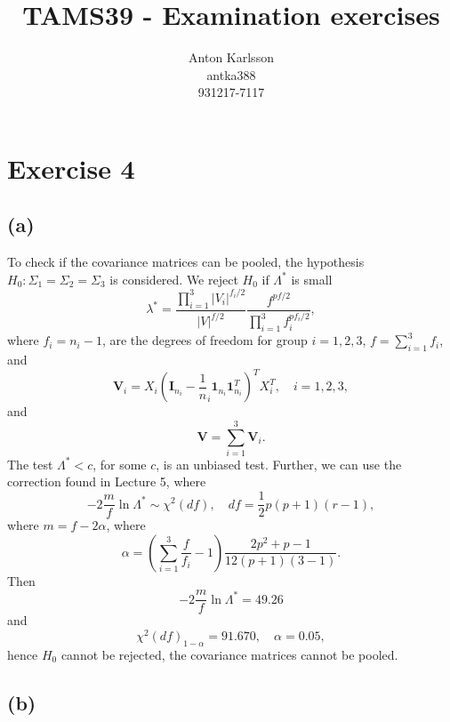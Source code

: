 \message{ !name(examination.tex)}\documentclass[one column]{report}
\title{TAMS39 - Examination exercises}
\author{Anton Karlsson\\antka388\\931217-7117}
\date{}
\renewcommand{\b}[1]{\bm{#1}}
\newcommand{\abs}[1]{
  \left|
    #1
  \right|}
\begin{document}
\section*{Exercise 4}
\label{sec:exercise-4}

\subsection*{(a)}
\label{sec:a-3}

To check if the covariance matrices can be pooled, the hypothesis
$H_{0}: \Sigma_{1} =\Sigma_{2}  = \Sigma_{3}$ is considered. We
reject $H_{0}$ if  $\Lambda^{*}$ is small
\begin{equation*}
  \lambda^* = \frac{\prod_{i = 1}^{3} \abs{V_i}^{f_i/2}}{\abs{V}^{f/2}}
  \frac{f^{pf/2}}{\prod_{i = 1}^{3} f_i ^{pf_{i}/2}},
\end{equation*}
where $f_{i} = n_{i} - 1$, are the degrees of freedom for group $i = 1,
2, 3$, $f = \sum_{i=1}^{3}f_{i}$, and
\begin{equation*}
  \b V_{i} = X_{i} (\b I_{n_{i}}  - \frac 1n_{i}\b 1_{n_{i}} \b 1_{n_{i}}^{T})^{T}
  X_{i}^{T},\quad i = 1,2,3,
\end{equation*}
and
\begin{equation*}
  \b V = \sum_{i=1}^{3} \b V_{i}.
\end{equation*}
The test $\Lambda^{*} < c$, for some $c$, is an unbiased test.
Further, we can use the correction found in Lecture 5, where
\begin{equation*}
  -2 \frac{m}{f} \ln \Lambda^{*} \sim \chi^{2}(df), \quad df = \frac{1}{2}p(p+1)(r-1),
\end{equation*}
where $m = f- 2\alpha$, where
\begin{equation*}
  \alpha = 
  \left(
    \sum_{i = 1}^{3} \frac{f}{f_{i}} - 1
  \right)
  \frac{2p^{2} + p -1}{12(p+1)(3-1)}.
\end{equation*}
Then 
\begin{equation*}
   -2 \frac{m}{f} \ln \Lambda^{*} = 49.26
\end{equation*}
and
\begin{equation*}
  \chi^{2}(df)_{1 - \alpha} = 91.670, \quad \alpha = 0.05,
\end{equation*}
hence $H_{0}$ cannot be rejected, the covariance matrices cannot be
pooled. 
\subsection*{(b)}
\label{sec:b-3}
\end{document}
